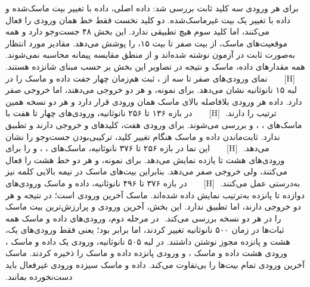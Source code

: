 ‫
‫برای هر ورودی سه کلید ثابت بررسی شد: داده اصلی، داده با تغییر بیت ماسک‌شده و داده با تغییر یک بیت غیرماسک‌شده. دو کلید نخست فقط خط همان ورودی را فعال می‌کنند، اما کلید سوم هیچ تطبیقی ندارد. این بخش ۴۸ جست‌وجو دارد و همه موقعیت‌های ماسک، از بیت صفر تا بیت ۱۵، را پوشش می‌دهد. مقادیر مورد انتظار به‌صورت ثابت در آزمون نوشته شده‌اند و از منطق مقایسه پیمانه محاسبه نمی‌شوند. همه مقدارهای داده، ماسک و نتیجه در تصاویر این بخش بر حسب مبنای شانزده هستند.
‫
‫[H]
‫
‫
‫
‫
‫
‫نمای ورودی‌های صفر تا سه از ، ثبت هم‌زمان چهار جفت داده و ماسک را در لبه ۱۵ نانوثانیه نشان می‌دهد. برای نمونه،  و  هر دو خروجی  می‌دهند، اما  خروجی صفر دارد. داده هر ورودی بلافاصله بالای ماسک همان ورودی قرار دارد و هر دو نسخه همین ترتیب را دارند.
‫
‫[H]
‫
‫
‫
‫
‫
‫در بازه ۱۳۶ تا ۲۵۶ نانوثانیه، ورودی‌های چهار تا هفت با ماسک‌های ، ،  و  بررسی می‌شوند. برای ورودی هفت، کلیدهای  و  خروجی  دارند و  تطبیق ندارد. ثابت‌ماندن داده و ماسک هنگام تغییر کلید، ترکیبی‌بودن جست‌وجو را نشان می‌دهد.
‫
‫[H]
‫
‫
‫
‫
‫
‫این نما در بازه ۲۵۶ تا ۳۷۶ نانوثانیه، ماسک‌های ، ،  و  را برای ورودی‌های هشت تا یازده نمایش می‌دهد. برای نمونه،  و  هر دو خط هشت را فعال می‌کنند، ولی  خروجی صفر می‌دهد. بنابراین بیت‌های ماسک در نیمه بالایی کلمه نیز به‌درستی عمل می‌کنند.
‫
‫[H]
‫
‫
‫
‫
‫
‫در بازه ۳۷۶ تا ۴۹۶ نانوثانیه، داده و ماسک ورودی‌های دوازده تا پانزده به‌ترتیب نمایش داده شده‌اند. ماسک آخرین ورودی  است؛ در نتیجه  و  هر دو خروجی  دارند، اما  تطبیق ندارد. این بخش، آخرین ورودی و پرارزش‌ترین بیت ماسک را در هر دو نسخه بررسی می‌کند.
‫
‫در مرحله دوم، ورودی‌های داده و ماسک همه ثبات‌ها در زمان ۵۰۰ نانوثانیه تغییر کردند، اما  برابر  بود؛ یعنی فقط ورودی‌های یک، هشت و پانزده مجوز نوشتن داشتند. در لبه ۵۰۵ نانوثانیه، ورودی یک داده  و ماسک ، ورودی هشت داده  و ماسک ، و ورودی پانزده داده  و ماسک  را ذخیره کردند. ماسک آخرین ورودی تمام بیت‌ها را بی‌تفاوت می‌کند. داده و ماسک سیزده ورودی غیرفعال باید دست‌نخورده بمانند.
